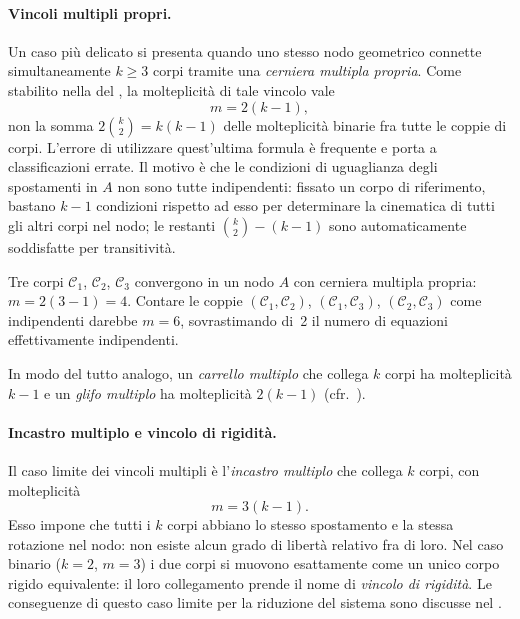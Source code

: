 \paragraph{Vincoli multipli propri.}
Un caso più delicato si presenta quando uno stesso nodo
geometrico connette simultaneamente $k \geq 3$ corpi tramite
una \emph{cerniera multipla propria}. Come stabilito nella
 del ,
la molteplicità di tale vincolo vale
\begin{equation}\label{eq:molt_cerniera_multipla_richiamo}
	m = 2(k-1),
\end{equation}
non la somma $2\binom{k}{2} = k(k-1)$ delle molteplicità
binarie fra tutte le coppie di corpi. L'errore di utilizzare
quest'ultima formula è frequente e porta a classificazioni
errate. Il motivo è che le condizioni di uguaglianza degli
spostamenti in $A$ non sono tutte indipendenti: fissato un
corpo di riferimento, bastano $k-1$ condizioni rispetto ad
esso per determinare la cinematica di tutti gli altri corpi
nel nodo; le restanti $\binom{k}{2}-(k-1)$ sono automaticamente
soddisfatte per transitività.

\begin{esempio}
	Tre corpi $\mathcal{C}_1$, $\mathcal{C}_2$, $\mathcal{C}_3$
	convergono in un nodo $A$ con cerniera multipla propria:
	$m = 2(3-1) = 4$. Contare le coppie
	$(\mathcal{C}_1,\mathcal{C}_2)$,
	$(\mathcal{C}_1,\mathcal{C}_3)$,
	$(\mathcal{C}_2,\mathcal{C}_3)$ come indipendenti darebbe
	$m = 6$, sovrastimando di~2 il numero di equazioni
	effettivamente indipendenti.
\end{esempio}

In modo del tutto analogo, un \emph{carrello multiplo} che
collega $k$ corpi ha molteplicità $k-1$ e un \emph{glifo
	multiplo} ha molteplicità $2(k-1)$
(cfr.\ ).

\paragraph{Incastro multiplo e vincolo di rigidità.}
Il caso limite dei vincoli multipli è l'\emph{incastro multiplo}
che collega $k$ corpi, con molteplicità
\begin{equation}\label{eq:molt_incastro_multiplo_richiamo}
	m = 3(k-1).
\end{equation}
Esso impone che tutti i $k$ corpi abbiano lo stesso spostamento
e la stessa rotazione nel nodo: non esiste alcun grado di
libertà relativo fra di loro. Nel caso binario ($k = 2$, $m = 3$)
i due corpi si muovono esattamente come un unico corpo rigido
equivalente: il loro collegamento prende il nome di
\emph{vincolo di rigidità}. Le conseguenze di questo caso
limite per la riduzione del sistema sono discusse nel
.


